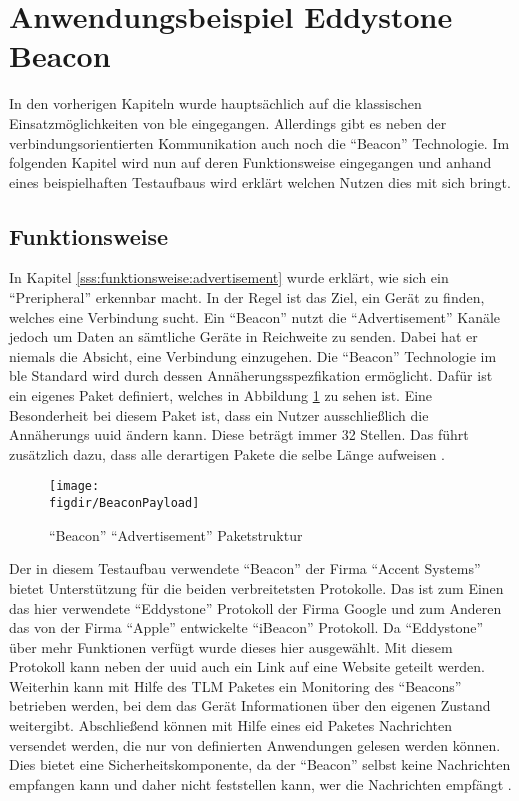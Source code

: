 \section{Anwendungsbeispiel Eddystone Beacon}
\label{s:ibeacon}

In den vorherigen Kapiteln wurde hauptsächlich auf die klassischen Einsatzmöglichkeiten von \ac{ble} eingegangen. Allerdings gibt es neben der verbindungsorientierten Kommunikation auch noch die "`Beacon"' Technologie. Im folgenden Kapitel wird nun auf deren Funktionsweise eingegangen und anhand eines beispielhaften Testaufbaus wird erklärt welchen Nutzen dies mit sich bringt.\\   

\subsection{Funktionsweise}
\label{ss:ibeacon:funktionsweise}

In Kapitel \ref{sss:funktionsweise:advertisement} wurde erklärt, wie sich ein "`Preripheral"' erkennbar macht. In der Regel ist das Ziel, ein Gerät zu finden, welches eine Verbindung sucht. Ein "`Beacon"' nutzt die "`Advertisement"' Kanäle jedoch um Daten an sämtliche Geräte in Reichweite zu senden. Dabei hat er niemals die Absicht, eine Verbindung einzugehen. Die "`Beacon"' Technologie im \ac{ble} Standard wird durch dessen Annäherungsspezfikation ermöglicht. Dafür ist ein eigenes Paket definiert, welches in Abbildung \ref{FIG:beaconPayload} zu sehen ist. Eine Besonderheit bei diesem Paket ist, dass ein Nutzer ausschließlich die Annäherungs \ac{uuid} ändern kann. Diese beträgt immer 32 Stellen. Das führt zusätzlich dazu, dass alle derartigen Pakete die selbe Länge aufweisen \cite[Seite 16]{Gast14:BPA}.\\

\begin{figure}[h]
	\centering
	\texttt{[image: \\figdir/BeaconPayload]}
	\caption{"`Beacon"' "`Advertisement"' Paketstruktur \cite[Seite 16]{Gast14:BPA}}
	\label{FIG:beaconPayload}
\end{figure}

\noindent Der in diesem Testaufbau verwendete "`Beacon"' der Firma "`Accent Systems"' bietet Unterstützung für die beiden verbreitetsten Protokolle. Das ist zum Einen das hier verwendete "`Eddystone"' Protokoll der Firma Google und zum Anderen das von der Firma "`Apple"' entwickelte "`iBeacon"' Protokoll. Da "`Eddystone"' über mehr Funktionen verfügt wurde dieses hier ausgewählt. Mit diesem Protokoll kann neben der \ac{uuid} auch ein Link auf eine Website geteilt werden. Weiterhin kann mit Hilfe des TLM Paketes ein Monitoring des "`Beacons"' betrieben werden, bei dem das Gerät Informationen über den eigenen Zustand weitergibt. Abschließend können mit Hilfe eines \ac{eid} Paketes Nachrichten versendet werden, die nur von definierten Anwendungen gelesen werden können. Dies bietet eine Sicherheitskomponente, da der "`Beacon"' selbst keine Nachrichten empfangen kann und daher nicht feststellen kann, wer die Nachrichten empfängt \cite{EDD:WWW}.\\

